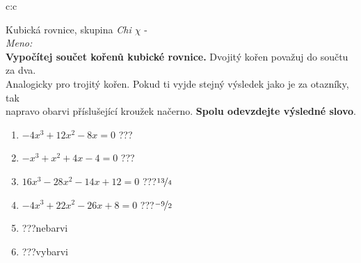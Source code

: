 \documentclass[10pt]{report}
\begin{document}
\clearpage
\thispagestyle{empty}
\begin{tabular}{c:c}
\begin{minipage}[c][99mm][t]{0.49\linewidth}
\begin{center}
\vspace{7mm}
{\huge Kubická rovnice, skupina \textit{Chi $\chi$} -}\\[4.5mm]
\textit{Meno:}\phantom{xxxxxxxxxxxxxxxxxxxxxxxxxxxxxxxxxxxxxxxxxxxxxxxxxxxxxxxxxxxxxxxxx}\\[3.5mm]
\textbf{Vypočítej součet kořenů kubické rovnice.} Dvojitý kořen považuj do součtu za dva.\\Analogicky pro trojitý kořen. Pokud ti vyjde stejný výsledek jako je za otazníky, tak\\napravo obarvi příslušející kroužek načerno. \textbf{Spolu odevzdejte výsledné slovo}.\\[3mm]
\begin{minipage}{0.77\linewidth}
\begin{center}
\begin{varwidth}{\textwidth}
\begin{enumerate}
\large
\item $-4x^3+12x^2-8x=0$\quad \dotfill\; ???\;\dotfill {}
\item $-x^3+x^2+4x-4=0$\quad \dotfill\; ???\;\dotfill {}
\item $16x^3-28x^2-14x+12=0$\quad \dotfill\; ???\;\dotfill \quad $\nicefrac{13}{4}$
\item $-4x^3+22x^2-26x+8=0$\quad \dotfill\; ???\;\dotfill \quad $\nicefrac{-9}{2}$
\item \quad \dotfill\; ???\;\dotfill \quad nebarvi
\item \quad \dotfill\; ???\;\dotfill \quad vybarvi
\end{enumerate}
\end{varwidth}
\end{center}
\end{minipage}
\begin{minipage}{0.20\linewidth}

\end{minipage}
\end{center}
\end{minipage}
\end{tabular}
\end{document}
